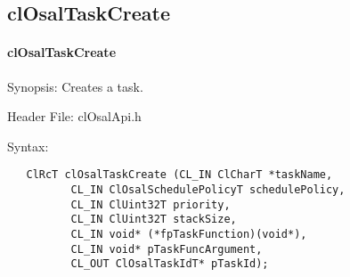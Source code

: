 \subsection{clOsalTaskCreate}
\hypertarget{pageosal103}{}\paragraph{cl\-Osal\-Task\-Create}\label{pageosal103}
\begin{Desc}
\item[Synopsis:]Creates a task.\end{Desc}
\begin{Desc}
\item[Header File:]clOsalApi.h\end{Desc}
\begin{Desc}
\item[Syntax:]

\footnotesize\begin{verbatim}   ClRcT clOsalTaskCreate (CL_IN ClCharT *taskName,
          CL_IN ClOsalSchedulePolicyT schedulePolicy,
          CL_IN ClUint32T priority,
          CL_IN ClUint32T stackSize,
          CL_IN void* (*fpTaskFunction)(void*),
          CL_IN void* pTaskFuncArgument,
          CL_OUT ClOsalTaskIdT* pTaskId);
\end{verbatim}
\normalsize
\end{Desc}
